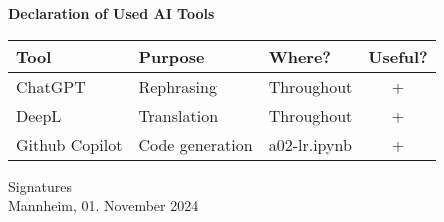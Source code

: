 \documentclass[a4paper,oneside,bibliography=totoc]{scrartcl}
\begin{document}
\begin{center}
  \textbf{Declaration of Used AI Tools} \\[.3em]
  \begin{tabularx}{\textwidth}{lXlc}
    \toprule
    Tool & Purpose & Where? & Useful? \\
    \midrule
    ChatGPT & Rephrasing & Throughout & + \\
    DeepL & Translation & Throughout & + \\
    Github Copilot & Code generation & a02-lr.ipynb & + \\
    \bottomrule
  \end{tabularx}
\end{center}

\vspace{2cm}
\noindent Signatures\\
\noindent Mannheim, 01. November 2024 \hfill
\end{document}
